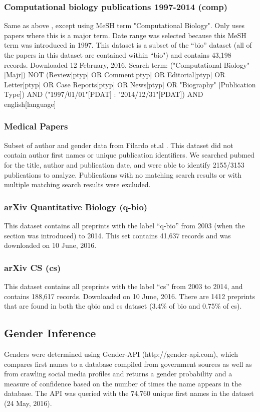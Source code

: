 \documentclass[10pt,letterpaper]{article}
\begin{document}
\begin{flushleft}
\subsubsection*{Computational biology publications 1997-2014 (comp)}
Same as above \cite{Bonham2016}, except using MeSH term "Computational Biology". Only uses papers where this is a major term. Date range was selected because this MeSH term was introduced in 1997. This dataset is a subset of the “bio” dataset (all of the papers in this dataset are contained within “bio") and contains 43,198 records. Downloaded 12 February, 2016. Search term: ("Computational Biology"[Majr]) NOT (Review[ptyp] OR Comment[ptyp] OR Editorial[ptyp] OR Letter[ptyp] OR Case Reports[ptyp] OR News[ptyp] OR "Biography" [Publication Type]) AND ("1997/01/01"[PDAT] : "2014/12/31"[PDAT]) AND english[language]

\subsubsection*{Medical Papers}
Subset of author and gender data from Filardo et.al \cite{Filardo2016}. This dataset did not contain author first names or unique publication identifiers. We searched pubmed for the title, author and publication date, and were able to identify 2155/3153 publications to analyze. Publications with no matching search results or with multiple matching search results were excluded.

\subsubsection*{arXiv Quantitative Biology (q-bio)}
This dataset \cite{Bonham2016a} contains all preprints with the label “q-bio” from 2003 (when the section was introduced) to 2014. This set contains 41,637 records and was downloaded on 10 June, 2016.

\subsubsection*{arXiv CS (cs)}
This dataset \cite{Bonham2016a} contains all preprints with the label “cs” from 2003 to 2014, and contains 188,617 records. Downloaded on 10 June, 2016. There are 1412 preprints that are found in both the qbio and cs dataset (3.4\% of bio and 0.75\% of cs).

\subsection*{Gender Inference}
Genders were determined using Gender-API (http://gender-api.com), which compares first names to a database compiled from government sources as well as from crawling social media profiles and returns a gender probability and a measure of confidence based on the number of times the name appears in the database. The API was queried with the 74,760 unique first names in the dataset (24 May, 2016).


\end{flushleft}
\end{document}
